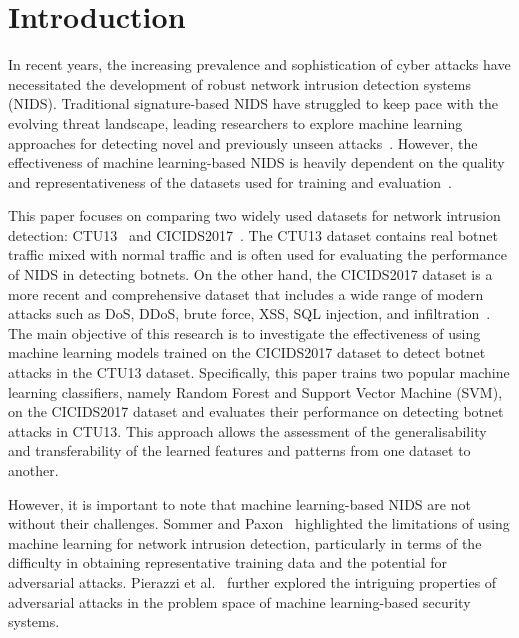\chapter{Introduction}

In recent years, the increasing prevalence and sophistication of cyber attacks have necessitated the development of robust network intrusion detection systems (NIDS). Traditional signature-based NIDS have struggled to keep pace with the evolving threat landscape, leading researchers to explore machine learning approaches for detecting novel and previously unseen attacks~\cite{marchetti2016analysis}. However, the effectiveness of machine learning-based NIDS is heavily dependent on the quality and representativeness of the datasets used for training and evaluation~\cite{engelen2021troubleshooting}.

This paper focuses on comparing two widely used datasets for network intrusion detection: CTU13~\cite{garcia2014empirical} and CICIDS2017~\cite{sharafaldin2018toward}. The CTU13 dataset contains real botnet traffic mixed with normal traffic and is often used for evaluating the performance of NIDS in detecting botnets. On the other hand, the CICIDS2017 dataset is a more recent and comprehensive dataset that includes a wide range of modern attacks such as DoS, DDoS, brute force, XSS, SQL injection, and infiltration~\cite{sharafaldin2018toward}. The main objective of this research is to investigate the effectiveness of using machine learning models trained on the CICIDS2017 dataset to detect botnet attacks in the CTU13 dataset. Specifically, this paper trains two popular machine learning classifiers, namely Random Forest and Support Vector Machine (SVM), on the CICIDS2017 dataset and evaluates their performance on detecting botnet attacks in CTU13. This approach allows the assessment of the generalisability and transferability of the learned features and patterns from one dataset to another.

However, it is important to note that machine learning-based NIDS are not without their challenges. Sommer and Paxon~\cite{sommer2010outside} highlighted the limitations of using machine learning for network intrusion detection, particularly in terms of the difficulty in obtaining representative training data and the potential for adversarial attacks. Pierazzi et al.~\cite{pierazzi2020intriguing} further explored the intriguing properties of adversarial attacks in the problem space of machine learning-based security systems.

